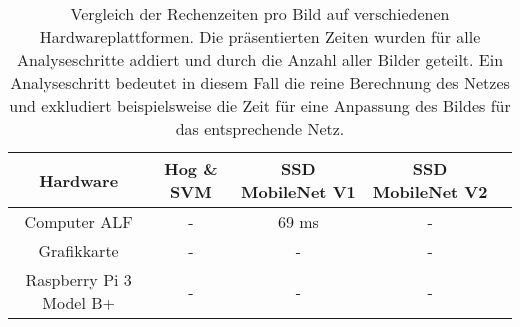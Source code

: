 \begin{table}[H]
	\caption{Vergleich der Rechenzeiten pro Bild auf verschiedenen Hardwareplattformen. Die präsentierten Zeiten wurden für alle Analyseschritte addiert und durch die Anzahl aller Bilder geteilt. Ein Analyseschritt bedeutet in diesem Fall die reine Berechnung des Netzes und exkludiert beispielsweise die Zeit für eine Anpassung des Bildes für das entsprechende Netz.  }
	\begin{center}
		\begin{tabular}{|c|c|c|c|c|}
			\hline
			\multicolumn{1}{|c|}{Hardware} & \multicolumn{1}{c|}{Hog \& SVM} & \multicolumn{1}{c|}{SSD MobileNet V1} & \multicolumn{1}{c|}{SSD MobileNet V2} \\ \hline
			Computer ALF	&- 	&69 ms		& - 	 \\
			Grafikkarte			&-	&-		& 	-  	 \\
			Raspberry Pi 3 Model B+			&-	&-		&- \\
			
			\hline
		\end{tabular}
	\end{center}

	\label{fig: zeitentab}
\end{table}